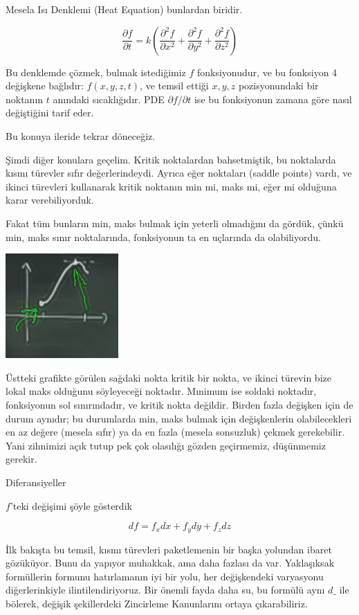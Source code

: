 \documentclass[12pt,fleqn]{article}\usepackage{../../common}
\begin{document}
Mesela Isı Denklemi (Heat Equation) bunlardan biridir. 

$$ \frac{\partial f}{\partial t}  = k (
\frac{\partial^2 f}{\partial x^2} + 
\frac{\partial^2 f}{\partial y^2} + 
\frac{\partial^2 f}{\partial z^2} )
$$

Bu denklemde çözmek, bulmak istediğimiz $f$ fonksiyonudur, ve bu
fonksiyon 4 değişkene bağlıdır: $f(x,y,z,t)$, ve temsil ettiği $x,y,z$
pozisyonundaki bir noktanın $t$ anındaki sıcaklığıdır. PDE
$\partial f/\partial t$ ise bu fonksiyonun zamana göre nasıl değiştiğini
tarif eder. 

Bu konuya ileride tekrar döneceğiz. 

Şimdi diğer konulara geçelim. Kritik noktalardan bahsetmiştik, bu
noktalarda kısmı türevler sıfır değerlerindeydi. Ayrıca eğer noktaları
(saddle points) vardı, ve ikinci türevleri kullanarak kritik noktanın min
mi, maks mi, eğer mi  olduğuna karar verebiliyorduk. 

Fakat tüm bunların min, maks bulmak için yeterli olmadığını da gördük,
çünkü min, maks sınır noktalarında, fonksiyonun ta en uçlarında da
olabiliyordu. 

\begin{center}
\includegraphics[height=4cm]{15_1.png}
\end{center}

Üstteki grafikte görülen sağdaki nokta kritik bir nokta, ve ikinci türevin bize
lokal maks olduğunu söyleyeceği noktadır. Mınimum ise soldaki noktadır,
fonksiyonun sol sınırındadır, ve kritik nokta değildir. Birden fazla değişken
için de durum aynıdır; bu durumlarda min, maks bulmak için değişkenlerin
olabilecekleri en az değere (mesela sıfır) ya da en fazla (mesela sonsuzluk)
çekmek gerekebilir. Yani zihnimizi açık tutup pek çok olasılığı gözden
geçirmemiz, düşünmemiz gerekir.

Diferansiyeller 

$f$'teki değişimi şöyle gösterdik

$$ df = f_xdx + f_ydy + f_zdz  $$

İlk bakışta bu temsil, kısmı türevleri paketlemenin bir başka yolundan
ibaret gözüküyor. Bunu da yapıyor muhakkak, ama daha fazlası da
var. Yaklaşıksak formüllerin formunu hatırlamanın iyi bir yolu, her
değişkendeki varyasyonu diğerlerinkiyle ilintilendiriyoruz. Bir önemli
fayda daha su, bu formülü aynı $d\_$ ile bölerek, değişik şekillerdeki
Zincirleme Kanunlarını ortaya çıkarabiliriz. 
\end{document}
